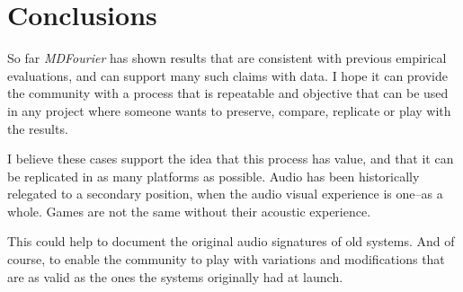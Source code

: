 \documentclass[10pt,a4paper]{report}
\begin{document}
\chapter{Conclusions}

So far \textit{MDFourier} has shown results that are consistent with previous empirical evaluations, and can support many such claims with data. I hope it can provide the community with a process that is repeatable and objective that can be used in any project where someone wants to preserve, compare, replicate or play with the results.

I believe these cases support the idea that this process has value, and that it can be replicated in as many platforms as possible. Audio has been historically relegated to a secondary position, when the audio visual experience is one--as a whole. Games are not the same without their acoustic experience.

This could help to document the original audio signatures of old systems. And of course, to enable the community to play with variations and modifications that are as valid as the ones the systems originally had at launch.
\end{document}
